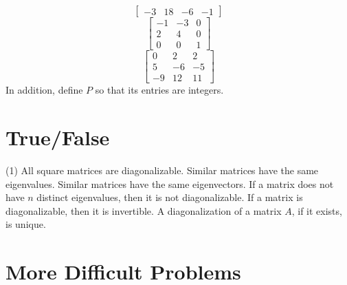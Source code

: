 \begin{tasks}[style=enumerate]
\begin{displaymath}
\begin{bmatrix}
      -3 & 18 & -6 & -1
    \end{bmatrix}
  \end{displaymath}
\task
  \begin{displaymath}
    \begin{bmatrix}
      -1 & -3 & 0 \\
      2 & 4 & 0 \\
      0 & 0 & 1
    \end{bmatrix}
  \end{displaymath}
\task \faCalculator
  \begin{displaymath}
    \begin{bmatrix}
      0 & 2 & 2 \\
      5 & -6 & -5 \\
      -9 & 12 & 11
    \end{bmatrix}
  \end{displaymath}
  In addition, define $P$ so that its entries are integers.
\end{tasks}

\section{True/False}

\trueFalseHeader

\begin{tasks}[resume, style=enumerate](1)
\task
  All square matrices are diagonalizable.
\task
  Similar matrices have the same eigenvalues.
\task
  Similar matrices have the same eigenvectors.
\task
  If a matrix does not have $n$ distinct eigenvalues, then it is not
  diagonalizable.
\task
  If a matrix is diagonalizable, then it is invertible.
\task
  A diagonalization of a matrix $A$, if it exists, is unique.
\end{tasks}

\section{More Difficult Problems}

